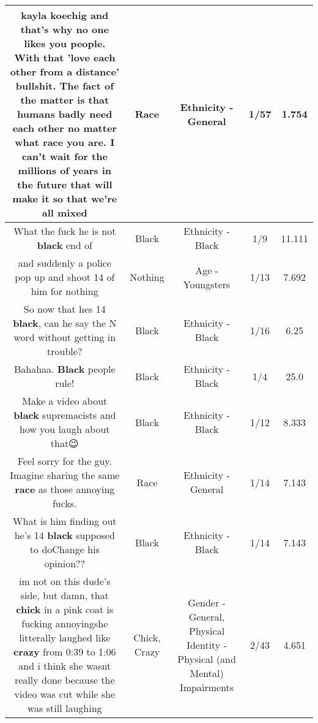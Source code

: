 \documentclass[11pt]{article}
\newlength\mylength
\begin{document}
\begin{center}
\begin{longtable}{|C{.65\mylength}|C{.30\mylength}|C{.12\mylength}|C{.12\mylength}|C{.12\mylength}|}
  \small kayla koechig and that's why no one likes you people. With that 'love each other from a distance' bullshit. The fact of the matter is that humans badly need each other no matter what \textbf{race} you are. I can't wait for the millions of years in the future that will make it so that we're all mixed\normalsize   & Race & Ethnicity - General & 1/57 & 1.754 \\  \hline
  \small What the fuck he is not \textbf{black} end of\normalsize   & Black & Ethnicity - Black & 1/9 & 11.111 \\  \hline
  \small and suddenly a police pop up and shoot 14 of him for nothing\normalsize   & Nothing & Age - Youngsters & 1/13 & 7.692 \\  \hline
  \small So now that hes 14 \textbf{black},  can he say the N word without getting in trouble?\normalsize   & Black & Ethnicity - Black & 1/16 & 6.25 \\  \hline
  \small Bahahaa. \textbf{Black} people rule!\normalsize   & Black & Ethnicity - Black & 1/4 & 25.0 \\  \hline
  \small Make a video about \textbf{black} supremacists and how you laugh about that😉\normalsize   & Black & Ethnicity - Black & 1/12 & 8.333 \\  \hline
  \small Feel sorry for the guy. Imagine sharing the same \textbf{race} as those annoying fucks.\normalsize   & Race & Ethnicity - General & 1/14 & 7.143 \\  \hline
  \small What is him finding out he's 14 \textbf{black} supposed to doChange his opinion??\normalsize   & Black & Ethnicity - Black & 1/14 & 7.143 \\  \hline
  \small im not on this dude's side, but damn, that \textbf{chick} in a pink coat is fucking annoyingshe litterally laughed like \textbf{crazy} from 0:39 to 1:06 and i think she wasnt really done because the video was cut while she was still laughing\normalsize   & Chick, Crazy & Gender - General, Physical Identity - Physical (and Mental) Impairments & 2/43 & 4.651 \\  \hline

\end{longtable}
\end{center}
\end{document}
